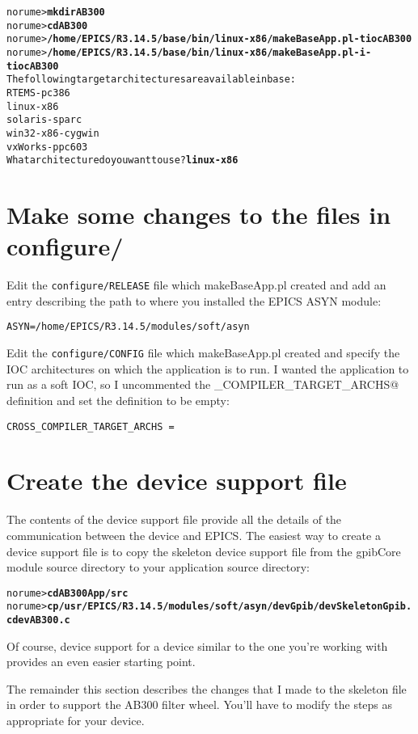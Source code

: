 \documentclass[twoside]{article}
\begin{document}
\begin{alltt}
norume> {\bf mkdir AB300}
norume> {\bf cd AB300}
norume> {\bf /home/EPICS/R3.14.5/base/bin/linux-x86/makeBaseApp.pl -t ioc AB300}
norume> {\bf /home/EPICS/R3.14.5/base/bin/linux-x86/makeBaseApp.pl -i -t ioc AB300}
The following target architectures are available in base:
    RTEMS-pc386
    linux-x86
    solaris-sparc
    win32-x86-cygwin
    vxWorks-ppc603
What architecture do you want to use? {\bf linux-x86}
\end{alltt}

\section{Make some changes to the files in configure/}
Edit the {\tt configure/RELEASE} file which makeBaseApp.pl created and add an
entry describing the path to where you installed the EPICS ASYN module:
\begin{alltt}
ASYN=/home/EPICS/R3.14.5/modules/soft/asyn
\end{alltt}

Edit the {\tt configure/CONFIG} file which makeBaseApp.pl created and specify
the IOC architectures on which the application is to run.
I wanted the application to run as a soft IOC, so I uncommented the
\verb@CROSS_COMPILER_TARGET_ARCHS@ definition and set the definition
to be empty:
\begin{verbatim}
CROSS_COMPILER_TARGET_ARCHS =
\end{verbatim}

\section{Create the device support file}
The contents of the device support
file provide all the details of the communication between the device
and EPICS.
The easiest way to create a device support file is to copy
the skeleton device support file from the gpibCore module source directory to
your application source directory:
\begin{alltt}
norume> {\bf cd AB300App/src}
norume> {\bf cp /usr/EPICS/R3.14.5/modules/soft/asyn/devGpib/devSkeletonGpib.c devAB300.c}
\end{alltt}
Of course, device support for a device similar
to the one you're working with  provides an even easier starting point.

The remainder this section describes the changes that I made to the skeleton
file in order to support the AB300 filter wheel.
You'll have to modify the steps as appropriate for your device.
\end{document}
